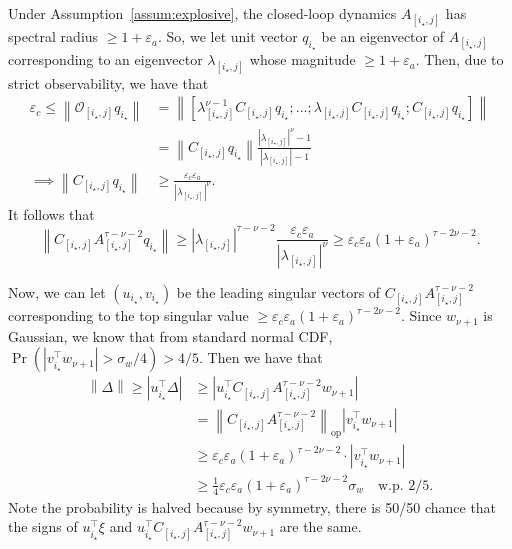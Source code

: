 \documentclass[11pt, twoside]{article}
\theoremstyle{definition}
\newcommand{\norm}[1]{\left\lVert #1 \right\rVert}
\newcommand{\opnorm}[1]{\norm{#1}_{\mathrm{op}}}
\begin{document}
Under Assumption~\ref{assum:explosive}, the closed-loop dynamics $A_{[i_\star, j]}$ has spectral radius $\ge 1+\varepsilon_a$.
So, we let unit vector $q_{i_\star}$ be an eigenvector of $A_{[i_\star, j]}$ corresponding to an eigenvector $\lambda_{[i_\star,j]}$ whose magnitude $\ge 1+\varepsilon_a$.
Then, due to strict observability, we have that
\begin{align*}
    \varepsilon_c \le \norm{\mathcal{O}_{[i_\star, j]} q_{i_\star}}
    &= \norm{\left[\lambda_{[i_\star,j]}^{\nu-1} C_{[i_\star, j]} q_{i_\star}; \dots; \lambda_{[i_\star,j]} C_{[i_\star, j]} q_{i_\star}; C_{[i_\star, j]} q_{i_\star}\right]} \\
    &= \norm{C_{[i_\star, j]}q_{i_\star}} \frac{|\lambda_{[i_\star,j]}|^\nu - 1}{|\lambda_{[i_\star,j]}| - 1} \\
    \implies
    \norm{C_{[i_\star, j]}q_{i_\star}}
    &\ge \frac{\varepsilon_c \varepsilon_a}{|\lambda_{[i_\star,j]}|^\nu}.
\end{align*}
It follows that \[\norm{C_{[i_\star, j]} A_{[i_\star, j]}^{\tau-\nu-2} q_{i_\star}} \ge |\lambda_{[i_\star,j]}|^{\tau-\nu-2}\frac{\varepsilon_c \varepsilon_a}{|\lambda_{[i_\star,j]}|^\nu} \ge \varepsilon_c \varepsilon_a (1+\varepsilon_a)^{\tau-2\nu-2}. \]

Now, we can let $(u_{i_\star}, v_{i_\star})$ be the leading singular vectors of $C_{[i_\star, j]} A_{[i_\star, j]}^{\tau-\nu-2}$ corresponding to the top singular value $\ge \varepsilon_c \varepsilon_a (1+\varepsilon_a)^{\tau-2\nu-2}$.
Since $w_{\nu+1}$ is Gaussian, we know that from standard normal CDF, $\Pr(|v_{i_\star}^\top w_{\nu+1}| > \sigma_w/4) > 4/5$.
Then we have that
\begin{align*}
    \norm{\Delta} \ge |u_{i_\star}^\top \Delta|
    &\ge |u_{i_\star}^\top C_{[i_\star, j]} A_{[i_\star, j]}^{\tau-\nu-2} w_{\nu+1}| \\
    &= \opnorm{C_{[i_\star, j]} A_{[i_\star, j]}^{\tau-\nu-2}} |v_{i_\star}^\top w_{\nu+1}| \\
    &\ge \varepsilon_c \varepsilon_a (1+\varepsilon_a)^{\tau-2\nu-2} \cdot |v_{i_\star}^\top w_{\nu+1}| \\
    &\ge \frac{1}{4}\varepsilon_c \varepsilon_a (1+\varepsilon_a)^{\tau-2\nu-2} \sigma_w \quad \text{w.p. } 2/5.
\end{align*}
Note the probability is halved because by symmetry, there is 50/50 chance that the signs of $u_{i_\star}^\top\xi$ and $u_{i_\star}^\top C_{[i_\star, j]} A_{[i_\star, j]}^{\tau-\nu-2} w_{\nu+1}$ are the same.
\end{document}
